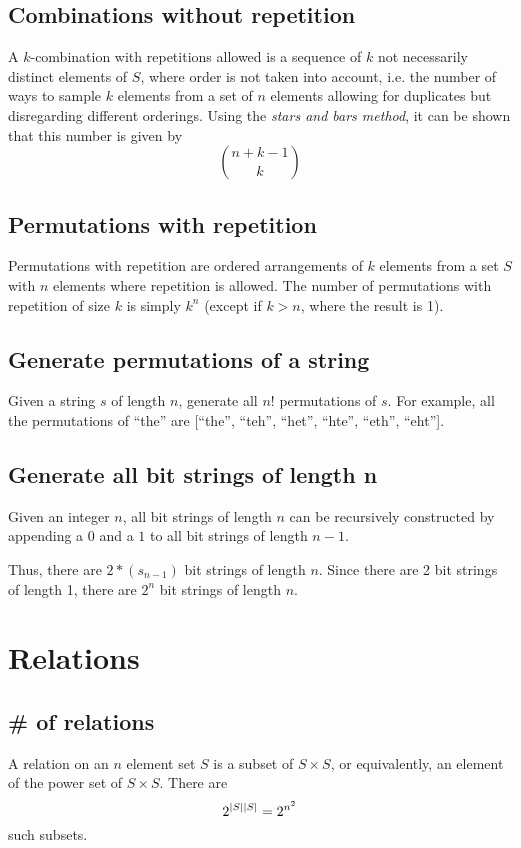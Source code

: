 \documentclass{article}
\begin{document}
\subsection{Combinations without repetition}
A $k$-combination with repetitions allowed is a sequence of $k$ not necessarily distinct elements of $S$, where order is not taken into account, i.e. the number of ways to sample $k$ elements from a set of $n$ elements allowing for duplicates but disregarding different orderings. Using the \emph{stars and bars method}, it can be shown that this number is given by
\[{n+k-1 \choose k}\]

\subsection{Permutations with repetition}
Permutations with repetition are ordered arrangements of $k$ elements from a set $S$ with $n$ elements where repetition is allowed. The number of permutations with repetition of size $k$ is simply $k^n$ (except if $k > n$, where the result is 1).
\subsection{Generate permutations of a string}
Given a string $s$ of length $n$, generate all $n!$ permutations of $s$. For example, all the permutations of ``the'' are [``the'', ``teh'', ``het'', ``hte'', ``eth'', ``eht''].
\subsection{Generate all bit strings of length n}
Given an integer $n$, all bit strings of length $n$ can be recursively constructed by appending a $0$ and a $1$ to all bit strings of length $n-1$.

\noindent Thus, there are $2*(s_{n-1})$ bit strings of length $n$. Since there are 2 bit strings of length 1, there are $2^n$ bit strings of length $n$. 

\section{Relations}
\subsection{\# of relations}
A relation on an $n$ element set $S$ is a subset of $S \times S$, or equivalently, an element of the power set of $S \times S$. There are
\[2^{\,\abs{S}\,\abs{S}}=2^{n^2}\]
such subsets.
\end{document}
